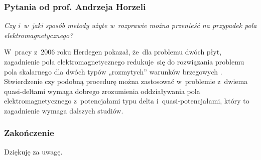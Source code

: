 \documentclass[10pt,t]{beamer}
\begin{document}
\begin{frame}
  \frametitle{Pytania od prof. Andrzeja Horzeli}


  \textit{Czy i~w~jaki sposób metody użyte w~rozprawie można przenieść
    na przypadek pola elektromagnetycznego?}

  W~pracy z~2006 roku Herdegen pokazał, że~dla problemu dwóch płyt,
  zagadnienie pola elektromagnetycznego redukuje~się do rozwiązania problemu
  pola skalarnego dla dwóch typów „rozmytych” warunków brzegowych
  \parencite{Herdegen-Quantum-backreaction-ETC-Part-II-Pub-2006}.
  Stwierdzenie czy podobną procedurę można zastosować w~problemie z~dwiema
  quasi-deltami wymaga dobrego zrozumienia oddziaływania pola
  elektromagnetycznego z~potencjałami typu delta i~quasi-potencjałami,
  który to zagadnienie wymaga dalszych studiów.

\end{frame}

















\begin{frame}
  \frametitle{Zakończenie}

  \vspace{7em}


  \begin{center}

    \Large

    Dziękuję za uwagę.

  \end{center}

\end{frame}











\printbibliography





\end{document}
